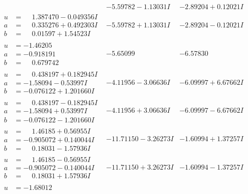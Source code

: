 \documentclass[1p]{elsarticle_modified}
\theoremstyle{definition}
\begin{document}
$$\begin{array}{c|c|c}
 & -5.59782 - 1.13031 I & -2.89204 + 0.12021 I \\ \hline\begin{aligned}
u &= \phantom{-}1.387470 - 0.049356 I \\
a &= \phantom{-}0.335276 + 0.492303 I \\
b &= \phantom{-}0.01597 + 1.54523 I\end{aligned}
 & -5.59782 + 1.13031 I & -2.89204 - 0.12021 I \\ \hline\begin{aligned}
u &= -1.46205\phantom{ +0.000000I} \\
a &= -0.918191\phantom{ +0.000000I} \\
b &= \phantom{-}0.679742\phantom{ +0.000000I}\end{aligned}
 & -5.65099\phantom{ +0.000000I} & -6.57830\phantom{ +0.000000I} \\ \hline\begin{aligned}
u &= \phantom{-}0.438197 + 0.182945 I \\
a &= -1.58094 - 0.53997 I \\
b &= -0.076122 + 1.201660 I\end{aligned}
 & -4.11956 - 3.06636 I & -6.09997 + 6.67662 I \\ \hline\begin{aligned}
u &= \phantom{-}0.438197 - 0.182945 I \\
a &= -1.58094 + 0.53997 I \\
b &= -0.076122 - 1.201660 I\end{aligned}
 & -4.11956 + 3.06636 I & -6.09997 - 6.67662 I \\ \hline\begin{aligned}
u &= \phantom{-}1.46185 + 0.56955 I \\
a &= -0.905072 + 0.140044 I \\
b &= \phantom{-}0.18031 - 1.57936 I\end{aligned}
 & -11.71150 - 3.26273 I & -1.60994 + 1.37257 I \\ \hline\begin{aligned}
u &= \phantom{-}1.46185 - 0.56955 I \\
a &= -0.905072 - 0.140044 I \\
b &= \phantom{-}0.18031 + 1.57936 I\end{aligned}
 & -11.71150 + 3.26273 I & -1.60994 - 1.37257 I \\ \hline\begin{aligned}
u &= -1.68012\phantom{ +0.000000I} \\

\end{aligned}
\end{array}$$
\end{document}
